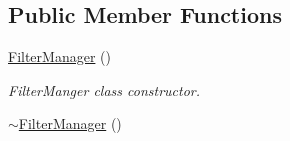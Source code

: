 \subsection*{Public Member Functions}
\begin{DoxyCompactItemize}
\item 
\hyperlink{classimage__tools_1_1FilterManager_aa93d9a5defcf40b35cf92e7e6e7d22f1}{Filter\+Manager} ()\hypertarget{classimage__tools_1_1FilterManager_aa93d9a5defcf40b35cf92e7e6e7d22f1}{}\label{classimage__tools_1_1FilterManager_aa93d9a5defcf40b35cf92e7e6e7d22f1}

\begin{DoxyCompactList}\small\item\em Filter\+Manger class constructor. \end{DoxyCompactList}\item 
\hyperlink{classimage__tools_1_1FilterManager_af19b1b8a9dff3c9160dd90e4f26d31e7}{$\sim$\+Filter\+Manager} ()\hypertarget{classimage__tools_1_1FilterManager_af19b1b8a9dff3c9160dd90e4f26d31e7}{}\label{classimage__tools_1_1FilterManager_af19b1b8a9dff3c9160dd90e4f26d31e7}


\end{DoxyCompactItemize}
